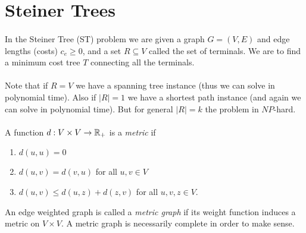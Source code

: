\documentclass[letterpaper,12pt,oneside,onecolumn]{article}
\begin{document}
\section{Steiner Trees}
\paragraph{}
In the Steiner Tree (ST) problem we are given a graph $G=(V,E)$ and edge lengths (costs) $c_e \geq 0$, and a set $R \subseteq V$ called the set of terminals. We are to find a minimum cost tree $T$ connecting all the terminals.
\paragraph{}
Note that if $R = V$ we have a spanning tree instance (thus we can solve in polynomial time). Also if $|R| = 1$ we have a shortest path instance (and again we can solve in polynomial time). But for general $|R| = k$ the problem in $NP$-hard.
\paragraph{}
A function $d : V \times V \rightarrow \mathbb{R}_+$ is a {\it metric} if 
\begin{enumerate}
\item $d(u,u) = 0$
\item $d(u,v) = d(v,u)$ for all $u,v \in V$
\item $d(u,v) \leq d(u,z) + d(z,v)$ for all $u,v,z \in V$.
\end{enumerate}
An edge weighted graph is called a {\it metric graph} if its weight function induces a metric on $V \times V$. A metric graph is necessarily complete in order to make sense.
\end{document}

